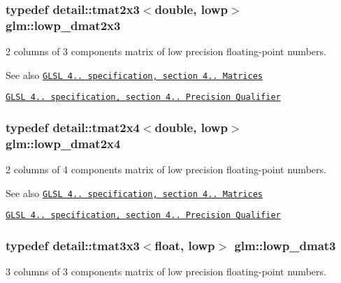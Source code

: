 \subsubsection[{\texorpdfstring{lowp\+\_\+dmat2x3}{lowp_dmat2x3}}]{\setlength{\rightskip}{0pt plus 5cm}typedef detail\+::tmat2x3$<$double, lowp$>$ {\bf glm\+::lowp\+\_\+dmat2x3}}\hypertarget{group__core__precision_ga2c7432984a35cf72050870a54485ef35}{}\label{group__core__precision_ga2c7432984a35cf72050870a54485ef35}
2 columns of 3 components matrix of low precision floating-\/point numbers.

\begin{DoxySeeAlso}{See also}
\href{http://www.opengl.org/registry/doc/GLSLangSpec.4.20.8.pdf}{\tt G\+L\+SL 4.. specification, section 4.. Matrices} 

\href{http://www.opengl.org/registry/doc/GLSLangSpec.4.20.8.pdf}{\tt G\+L\+SL 4.. specification, section 4.. Precision Qualifier} 
\end{DoxySeeAlso}
\subsubsection[{\texorpdfstring{lowp\+\_\+dmat2x4}{lowp_dmat2x4}}]{\setlength{\rightskip}{0pt plus 5cm}typedef detail\+::tmat2x4$<$double, lowp$>$ {\bf glm\+::lowp\+\_\+dmat2x4}}\hypertarget{group__core__precision_gac2285cef559b0dc35cb9a7f22e6a2dd8}{}\label{group__core__precision_gac2285cef559b0dc35cb9a7f22e6a2dd8}
2 columns of 4 components matrix of low precision floating-\/point numbers.

\begin{DoxySeeAlso}{See also}
\href{http://www.opengl.org/registry/doc/GLSLangSpec.4.20.8.pdf}{\tt G\+L\+SL 4.. specification, section 4.. Matrices} 

\href{http://www.opengl.org/registry/doc/GLSLangSpec.4.20.8.pdf}{\tt G\+L\+SL 4.. specification, section 4.. Precision Qualifier} 
\end{DoxySeeAlso}
\subsubsection[{\texorpdfstring{lowp\+\_\+dmat3}{lowp_dmat3}}]{\setlength{\rightskip}{0pt plus 5cm}typedef detail\+::tmat3x3$<$float, lowp$>$ {\bf glm\+::lowp\+\_\+dmat3}}\hypertarget{group__core__precision_ga07d9423bdde2d7ff880d6ece01dc9e32}{}\label{group__core__precision_ga07d9423bdde2d7ff880d6ece01dc9e32}
3 columns of 3 components matrix of low precision floating-\/point numbers.

